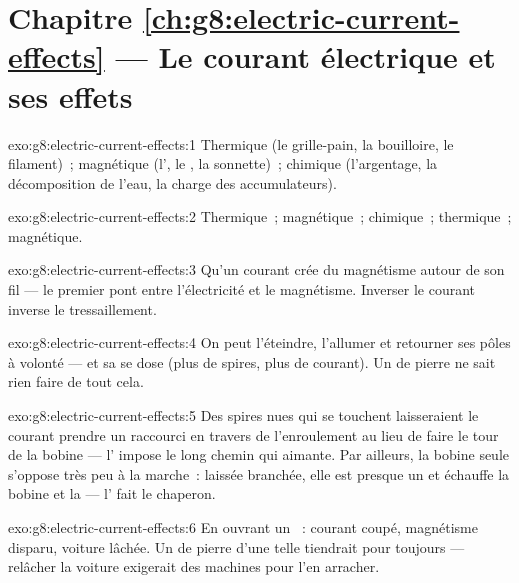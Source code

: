 \section*{Chapitre \ref{ch:g8:electric-current-effects} --- Le courant électrique et ses effets}

\begin{solution}{exo:g8:electric-current-effects:1}
Thermique (le grille-pain, la bouilloire, le filament)~; magnétique
(l', le , la sonnette)~; chimique (l'argentage, la
décomposition de l'eau, la charge des accumulateurs).
\end{solution}

\begin{solution}{exo:g8:electric-current-effects:2}
Thermique~; magnétique~; chimique~; thermique~; magnétique.
\end{solution}

\begin{solution}{exo:g8:electric-current-effects:3}
Qu'un courant crée du magnétisme autour de son fil --- le premier
pont entre l'électricité et le magnétisme. Inverser le courant
inverse le tressaillement.
\end{solution}

\begin{solution}{exo:g8:electric-current-effects:4}
On peut l'éteindre, l'allumer et retourner ses pôles à volonté --- et
sa  se dose (plus de spires, plus de courant). Un  de
pierre ne sait rien faire de tout cela.
\end{solution}

\begin{solution}{exo:g8:electric-current-effects:5}
Des spires nues qui se touchent laisseraient le courant prendre un
raccourci en travers de l'enroulement au lieu de faire le tour de la
bobine --- l' impose le long chemin qui aimante. Par ailleurs,
la bobine seule s'oppose très peu à la marche~: laissée branchée,
elle est presque un  et échauffe la bobine et la
 --- l' fait le chaperon.
\end{solution}

\begin{solution}{exo:g8:electric-current-effects:6}
En ouvrant un ~: courant coupé, magnétisme disparu,
voiture lâchée. Un  de pierre d'une telle  tiendrait pour
toujours --- relâcher la voiture exigerait des machines pour l'en
arracher.
\end{solution}

